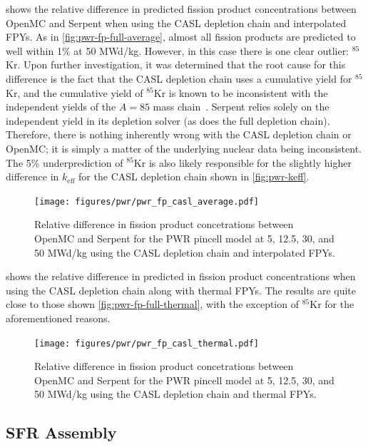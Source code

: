 \documentclass[3p,authoryear]{elsarticle}
\begin{document}
 shows the relative difference in predicted
fission product concentrations between OpenMC and Serpent when using the CASL
depletion chain and interpolated FPYs. As in \cref{fig:pwr-fp-full-average},
almost all fission products are predicted to well within 1\% at 50 MWd/kg.
However, in this case there is one clear outlier: $^{85}$Kr. Upon further
investigation, it was determined that the root cause for this difference is the
fact that the CASL depletion chain uses a cumulative yield for $^{85}$Kr, and
the cumulative yield of $^{85}$Kr is known to be inconsistent with the
independent yields of the $A=85$ mass chain~\citep{pigni2015nds}. Serpent relies
solely on the independent yield in its depletion solver (as does the full
depletion chain). Therefore, there is nothing inherently wrong with the CASL
depletion chain or OpenMC; it is simply a matter of the underlying nuclear data
being inconsistent. The 5\% underprediction of $^{85}$Kr is also likely
responsible for the slightly higher difference in $k_\text{eff}$ for the CASL
depletion chain shown in \cref{fig:pwr-keff}.
\begin{figure}[H]
  \centering
  \texttt{[image: figures/pwr/pwr\_fp\_casl\_average.pdf]}
  \caption{Relative difference in fission product concetrations between OpenMC
  and Serpent for the PWR pincell model at 5, 12.5, 30, and 50 MWd/kg using the
  CASL depletion chain and interpolated FPYs.}
  \label{fig:pwr-fp-casl-average}
\end{figure}

 shows the relative difference in predicted in
fission product concentrations when using the CASL depletion chain along with
thermal FPYs. The results are quite close to those shown
\cref{fig:pwr-fp-full-thermal}, with the exception of $^{85}$Kr for the
aforementioned reasons.
\begin{figure}[H]
  \centering
  \texttt{[image: figures/pwr/pwr\_fp\_casl\_thermal.pdf]}
  \caption{Relative difference in fission product concetrations between OpenMC
  and Serpent for the PWR pincell model at 5, 12.5, 30, and 50 MWd/kg using the
  CASL depletion chain and thermal FPYs.}
  \label{fig:pwr-fp-casl-thermal}
\end{figure}

\subsection{SFR Assembly}
\end{document}
